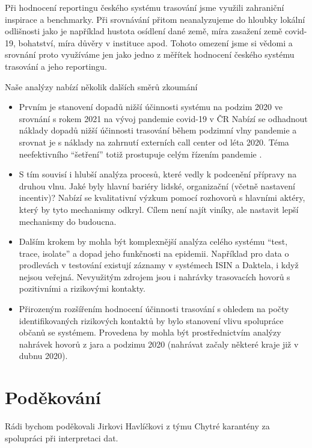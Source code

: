 Při hodnocení reportingu českého systému trasování jsme využili zahraniční inspirace a benchmarky. Při srovnávání přitom neanalyzujeme do hloubky lokální odlišnosti jako je například hustota osídlení dané země, míra zasažení země covid-19, bohatství, míra důvěry v instituce apod. Tohoto omezení jsme si vědomi a srovnání proto využíváme jen jako jedno z měřítek hodnocení českého systému trasování a jeho reportingu.

Naše analýzy nabízí několik dalších směrů zkoumání

\begin{itemize}
\item Prvním je stanovení dopadů nižší účinnosti systému na podzim 2020 ve srovnání s rokem 2021 na vývoj pandemie covid-19 v ČR Nabízí se odhadnout náklady dopadů nižší účinnosti trasování během podzimní vlny pandemie a srovnat je s náklady na zahrnutí externích call center od léta 2020. Téma neefektivního “šetření” totiž prostupuje celým řízením pandemie \cite{tr_ProkopN, tr_Zidek}.
\item S tím souvisí i hlubší analýza procesů, které vedly k podcenění přípravy na druhou vlnu. Jaké byly hlavní bariéry lidské, organizační (včetně nastavení incentiv)? Nabízí se kvalitativní výzkum pomocí rozhovorů s hlavními aktéry, který by tyto mechanismy odkryl. Cílem není najít viníky, ale nastavit lepší mechanismy do budoucna.
\item Dalším krokem by mohla být komplexnější analýza celého systému “test, trace, isolate” a dopad jeho funkčnosti na epidemii. Například pro data o prodlevách v testování existují záznamy v systémech ISIN a Daktela, i když nejsou veřejná. Nevyužitým zdrojem jsou i nahrávky trasovacích hovorů s pozitivními a rizikovými kontakty.
\item Přirozeným rozšířením hodnocení účinnosti trasování s ohledem na počty identifikovaných rizikových kontaktů by bylo stanovení vlivu spolupráce občanů se systémem. Provedena by mohla být prostřednictvím analýzy nahrávek hovorů z jara a podzimu 2020 (nahrávat začaly některé kraje již v dubnu 2020).
\end{itemize}

\section*{Poděkování}

Rádi bychom poděkovali Jirkovi Havlíčkovi z týmu Chytré karantény za spolupráci při interpretaci dat.

